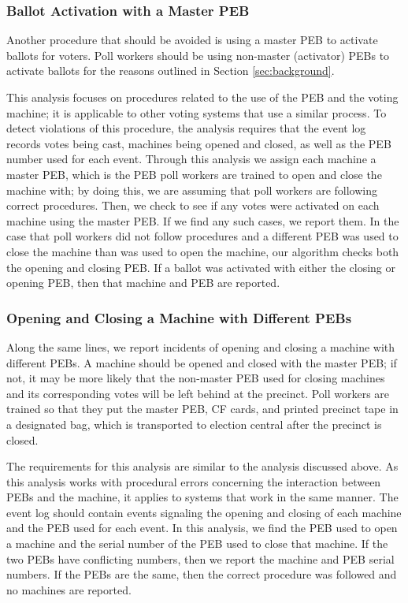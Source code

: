 \subsubsection{Ballot Activation with a Master PEB}
Another procedure that should be avoided is using a master PEB to activate ballots for voters.  Poll workers should be using non-master (activator) PEBs to activate ballots for the reasons outlined in Section \ref{sec:background}.

This analysis focuses on procedures related to the use of the PEB and the voting machine; it is applicable to other voting systems that use a similar process.  To detect violations of this procedure, the analysis requires that the event log records votes being cast, machines being opened and closed, as well as the PEB number used for each event.  Through this analysis we assign each machine a master PEB, which is the PEB poll workers are trained to open and close the machine with; by doing this, we are assuming that poll workers are following correct procedures.  Then, we check to see if any votes were activated on each machine using the master PEB.  If we find any such cases, we report them.  In the case that poll workers did not follow procedures and a different PEB was used to close the machine than was used to open the machine, our algorithm checks both the opening and closing PEB.  If a ballot was activated with either the closing or opening PEB, then that machine and PEB are reported.  

\subsubsection{Opening and Closing a Machine with Different PEBs}
\label{sec:opening_closing_diff_pebs}
Along the same lines, we report incidents of opening and closing a
machine with different PEBs. A machine should be opened and closed
with the master PEB; if not, it may be more likely that the non-master
PEB used for closing machines and its corresponding votes will be left behind at the precinct.  Poll workers are trained so that they put the master PEB, CF cards, and printed precinct tape in a designated bag, which is transported to election central after the precinct is closed.  

The requirements for this analysis are similar to the analysis discussed above.  As this analysis works with procedural errors concerning the interaction between PEBs and the machine, it applies to systems that work in the same manner.  The event log should contain events signaling the opening and closing of each machine and the PEB used for each event.  In this analysis, we find the PEB used to open a machine and the serial number of the PEB used to close that machine.  If the two PEBs have conflicting numbers, then we report the machine and PEB serial numbers.  If the PEBs are the same, then the correct procedure was followed and no machines are reported.  

